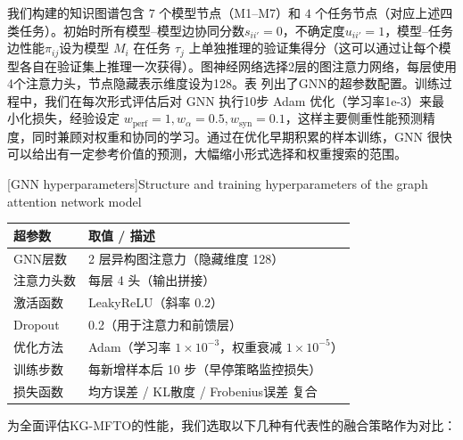 \documentclass[../main.tex]{subfiles}
\begin{document}

我们构建的知识图谱包含 $7$ 个模型节点（M1--M7）和 $4$ 个任务节点（对应上述四类任务）。初始时所有模型--模型边协同分数$s_{ii'}=0$，不确定度$u_{ii'}=1$，模型--任务边性能$\pi_{ij}$设为模型 $M_i$ 在任务 $\tau_j$ 上单独推理的验证集得分（这可以通过让每个模型各自在验证集上推理一次获得）。图神经网络选择2层的图注意力网络，每层使用4个注意力头，节点隐藏表示维度设为128。表 列出了GNN的超参数配置。训练过程中，我们在每次形式评估后对 GNN 执行10步 Adam 优化\cite{kingma2015adam}（学习率1e-3）来最小化损失，经验设定 $w_{\text{perf}}=1, w_{\alpha}=0.5, w_{\text{syn}}=0.1$，这样主要侧重性能预测精度，同时兼顾对权重和协同的学习。通过在优化早期积累的样本训练，GNN 很快可以给出有一定参考价值的预测，大幅缩小形式选择和权重搜索的范围。

\begin{table}[tb]
	\centering\small
	[GNN hyperparameters]{Structure and training hyperparameters of the graph attention network model}
	\label{tab:gat-hyperparams}
	\small\begin{tabular}{ll}
		\toprule
		\textbf{超参数} & \textbf{取值 / 描述}                                 \\
		\midrule
		GNN层数        & 2 层异构图注意力（隐藏维度 128）                              \\
		注意力头数        & 每层 4 头（输出拼接）                                     \\
		激活函数         & LeakyReLU（斜率 0.2）                                \\
		Dropout      & 0.2（用于注意力和前馈层）                                   \\
		优化方法         & Adam（学习率 $1\times10^{-3}$，权重衰减 $1\times10^{-5}$） \\
		训练步数         & 每新增样本后 10 步（早停策略监控损失）                            \\
		损失函数         & 均方误差 / KL散度 / Frobenius误差 复合                \\
		\bottomrule
	\end{tabular}
\end{table}


为全面评估KG-MFTO的性能，我们选取以下几种有代表性的融合策略作为对比：
\end{document}
